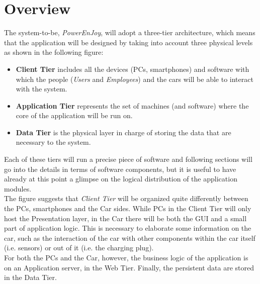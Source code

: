 \documentclass[11pt,a4paper]{report}
\begin{document}
\section{Overview}
The system-to-be, \textit{PowerEnJoy}, will adopt a three-tier architecture, which means that the application will be designed by taking into account three physical levels as shown in the following figure:
\begin{itemize}
\item \textbf{Client Tier} includes all the devices (PCs, smartphones) and software with which the people (\textit{Users} and \textit{Employees}) and the cars will be able to interact with the 			system.
\item \textbf{Application Tier} represents the set of machines (and 				software) where the core of the application will be run on.
\item \textbf{Data Tier} is the physical layer in charge of storing the data that are necessary to the system.
\end{itemize}
\noindent Each of these tiers will run a precise piece of software and following sections will go into the details in terms of software components, but it is useful to have already at this point a glimpse on the logical distribution of the application modules.\\
The figure suggests that \textit{Client Tier} will be organized quite differently between the PCs, smartphones and the Car sides. While PCs in the Client Tier will only host the Presentation layer, in the Car there will be both the GUI and a small part of application logic. This is necessary to elaborate some information on the car, such as the interaction of the car with other components within the car itself (i.e. sensors) or out of it (i.e. the charging plug).\\
For both the PCs and the Car, however, the business logic of the application is on an Application server, in the Web Tier. Finally, the persistent data are stored in the Data Tier.
\end{document}
